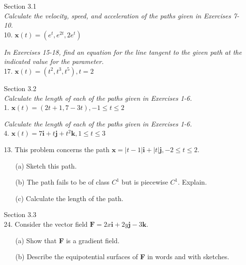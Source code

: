 \documentclass[12pt,letterpaper]{hmcpset}
\begin{document}

\begin{problem}
Section 3.1\\
\textit{Calculate the velocity, speed, and acceleration of the paths
given in Exercises 7-10.}\\
10. $\mathbf{x}(t) = (e^t , e^{2t} , 2e^t )$
\end{problem}
\newpage

\begin{problem}
\textit{In Exercises 15-18, find an equation for the line tangent to the
given path at the indicated value for the parameter.}\\
17. $\mathbf{x}(t) = (t^2, t^3, t^5), t = 2$
\end{problem}
\newpage


\begin{problem}
Section 3.2\\
\textit{Calculate the length of each of the paths given in Exercises
1-6.}\\
1. $\mathbf{x}(t) = (2t + 1, 7 - 3t), -1 \leq t \leq 2$
\end{problem}
\newpage


\begin{problem}
\textit{Calculate the length of each of the paths given in Exercises
1-6.}\\
4. $\mathbf{x}(t) = 7\mathbf{i} + t\mathbf{j} + t^2 \mathbf{k}, 1 \leq t \leq 3$
\end{problem}
\newpage


\begin{problem}
13. This problem concerns the path $\mathbf{x} = |t - 1| \mathbf{i} + |t| \mathbf{j}, 
−2 \leq t \leq 2$.
\begin{enumerate}
    \item[(a)]Sketch this path.
    \item[(b)]The path fails to be of class $C^1$ but is piecewise $C^1$. Explain.
    \item[(c)]Calculate the length of the path.
\end{enumerate}
\end{problem}
\newpage


\begin{problem}
Section 3.3\\
24. Consider the vector field $\mathbf{F} = 2x\mathbf{i} + 2y\mathbf{j} - 3\mathbf{k}$.
\begin{enumerate}
    \item[(a)]Show that \textbf{F} is a gradient field. 
    \item[(b)]Describe the equipotential surfaces of \textbf{F} in words and with sketches.
\end{enumerate}
\end{problem}
\newpage
\end{document}
